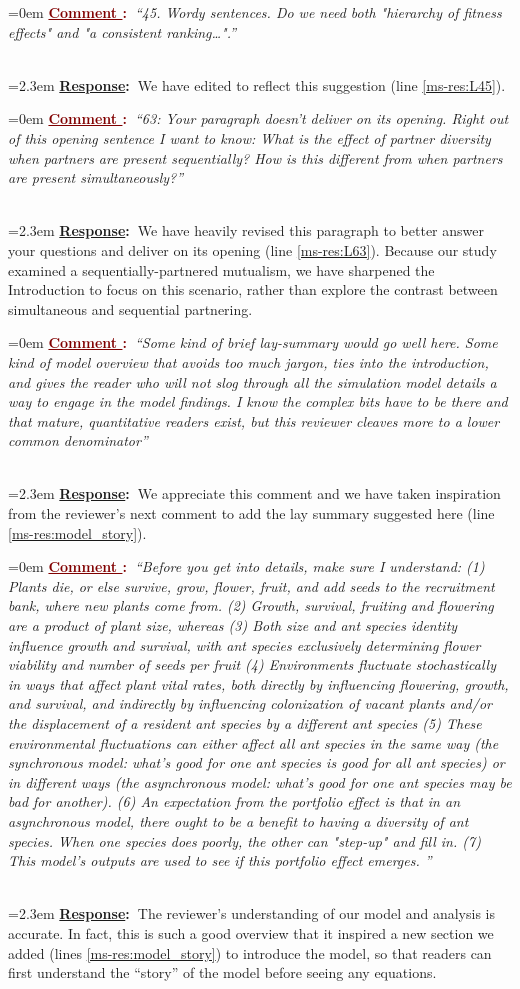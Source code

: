 \documentclass[12pt]{article}
\newcounter{cN}
\newcommand{\comment}[1]{
	\vspace{2em}
	\refstepcounter{cN} %
	\noindent \hangindent=0em \textbf{\textcolor{Maroon}{\uline{Comment \thecN}:~}}\emph{``#1''}
	}
\newcommand{\response}[1]{
	\\[0.25em]
	\hangindent=2.3em \textbf{\textcolor{NavyBlue}{\uline{Response}:~}}#1
	}
\begin{document}
\comment{45. Wordy sentences. Do we need both "hierarchy of fitness effects" and "a consistent ranking…".}
\response{We have edited to reflect this suggestion (line \ref{ms-res:L45}).}

\comment{63: Your paragraph doesn't deliver on its opening. 
Right out of this opening sentence I want to know: What is the effect of partner diversity when partners are present sequentially? 
How is this different from when partners are present simultaneously?}
\response{We have heavily revised this paragraph to better answer your questions and deliver on its opening (line \ref{ms-res:L63}). 
Because our study examined a sequentially-partnered mutualism, we have sharpened the Introduction to focus on this scenario, rather than explore the contrast between simultaneous and sequential partnering.}

\comment{Some kind of brief lay-summary would go well here. 
Some kind of model overview that avoids too much jargon, ties into the introduction, and gives the reader who will not slog through all the simulation model details a way to engage in the model findings. 
I know the complex bits have to be there and that mature, quantitative readers exist, but this reviewer cleaves more to a lower common denominator}
\response{We appreciate this comment and we have taken inspiration from the reviewer's next comment to add the lay summary suggested here (line \ref{ms-res:model_story}).}

\comment{Before you get into details, make sure I understand:
(1)     Plants die, or else survive, grow, flower, fruit, and add seeds to the recruitment bank, where new plants come from.
(2)     Growth, survival, fruiting and flowering are a product of plant size, whereas
(3)     Both size and ant species identity influence growth and survival, with ant species exclusively determining flower viability and number of seeds per fruit
(4)     Environments fluctuate stochastically in ways that affect plant vital rates, both directly by influencing flowering, growth, and survival, and indirectly by influencing colonization of vacant plants and/or the displacement of a resident ant species by a different ant species
(5)     These environmental fluctuations can either affect all ant species in the same way (the synchronous model:  what's good for one ant species is good for all ant species) or in different ways (the asynchronous model: what's good for one ant species may be bad for another).
(6)     An expectation from the portfolio effect is that in an asynchronous model, there ought to be a benefit to having a diversity of ant species. When one species does poorly, the other can "step-up" and fill in.
(7)     This model's outputs are used to see if this portfolio effect emerges. }
\response{The reviewer's understanding of our model and analysis is accurate. 
In fact, this is such a good overview that it inspired a new section we added (lines \ref{ms-res:model_story}) to introduce the model, so that readers can first understand the ``story'' of the model before seeing any equations.}


\end{document}
